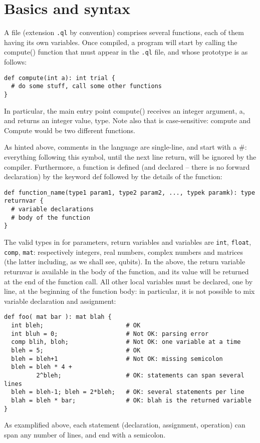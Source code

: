 \section{Basics and syntax}

A \QL file (extension \texttt{.ql} by convention) comprises several functions, each of them having its own variables. Once compiled, a program will start by calling the \textsf{compute()} function that must appear in the \texttt{.ql} file, and whose prototype is as follows:
\begin{lstlisting}
def compute(int a): int trial {
  # do some stuff, call some other functions
}
\end{lstlisting}
In particular, the main entry point \textsf{compute()} receives an integer argument, \textsf{a}, and returns an integer value, \textsf{type}.
Note also that \QL is case-sensitive: \textsf{compute} and \textsf{Compute} would be two different functions.

As hinted above, comments in the language are single-line, and start with a \#: everything following this symbol, until the next line return, will be ignored by the compiler. Furthermore, a function is defined (and declared -- there is no forward declaration) by the keyword \textsf{def} followed by the details of the function:
\begin{lstlisting}
def function_name(type1 param1, type2 param2, ..., typek paramk): type returnvar {
  # variable declarations
  # body of the function
}
\end{lstlisting}
The valid types  in \QL for parameters, return variables and variables are \texttt{int}, \texttt{float}, \texttt{comp}, \texttt{mat}: respectively integers, real numbers, complex numbers and matrices (the latter including, as we shall see, qubits). In the above, the return variable \textsf{returnvar} is available in the body of the function, and its value will be returned at the end of the function call. All other local variables must be declared, one by line, at the beginning of the function body: in particular, it is not possible to mix variable declaration and assignment:
\begin{lstlisting}
def foo( mat bar ): mat blah {
  int bleh;                       # OK
  int bluh = 0;                   # Not OK: parsing error
  comp blih, bloh;                # Not OK: one variable at a time
  bleh = 5;                       # OK
  bleh = bleh+1                   # Not OK: missing semicolon
  bleh = bleh * 4 +
         2^bleh;                  # OK: statements can span several lines
  bleh = bleh-1; bleh = 2*bleh;   # OK: several statements per line
  blah = bleh * bar;              # OK: blah is the returned variable
}
\end{lstlisting}
As examplified above, each statement (declaration, assignment, operation) can span any number of lines, and end with a semicolon.

